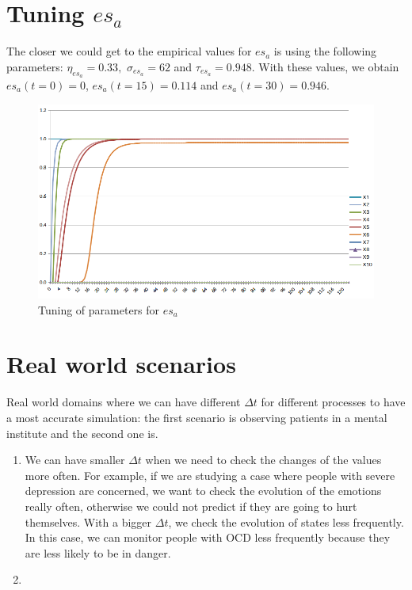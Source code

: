 \documentclass[a4paper]{article}
\begin{document}
\section{Tuning $es_{a}$}

The closer we could get to the empirical values for $es_{a}$ is using the following parameters: $\eta_{es_{a}} = 0.33,$ $\sigma_{es_{a}} = 62$ and $\tau_{es_{a}} = 0.948$. With these values, we obtain $es_{a}(t = 0) = 0$, $es_{a}(t = 15) = 0.114$ and $es_{a}(t = 30) = 0.946$.

\begin{figure}[!htpb]
\center
\includegraphics[width=\textwidth]{res/img/tuning}
\caption{Tuning of parameters for $es_{a}$}
\label{fig:tuning}
\end{figure}

\section{Real world scenarios}

Real world domains where we can have different $\Delta t$ for different processes to have a most accurate simulation: the first scenario is observing patients in a mental institute and the second one is.

\begin{enumerate}
\item We can have smaller $\Delta t$ when we need to check the changes of the values more often. For example, if we are studying a case where people with severe depression are concerned, we want to check the evolution of the emotions really often, otherwise we could not predict if they are going to hurt themselves. With a bigger $\Delta t$, we check the evolution of states less frequently. In this case, we can monitor people with OCD less frequently because they are less likely to be in danger.
\item 
\end{enumerate}
\end{document}
